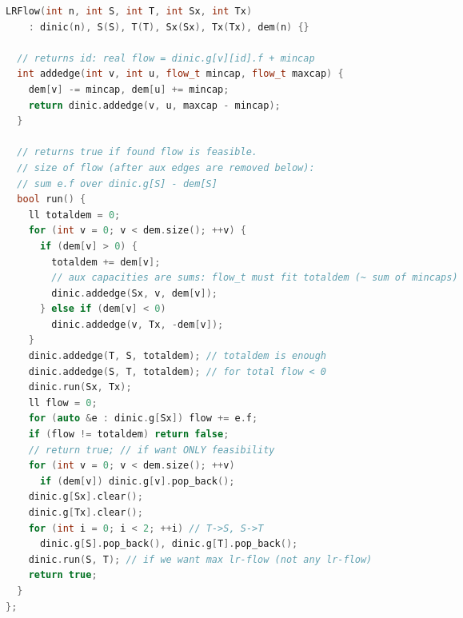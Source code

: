 \documentclass[8pt,a4paper,landscape,twosided]{extarticle}
\begin{document}
\begin{multicols*}{3}
\begin{lstlisting}[language=C++]
  LRFlow(int n, int S, int T, int Sx, int Tx)
    : dinic(n), S(S), T(T), Sx(Sx), Tx(Tx), dem(n) {}

  // returns id: real flow = dinic.g[v][id].f + mincap
  int addedge(int v, int u, flow_t mincap, flow_t maxcap) {
    dem[v] -= mincap, dem[u] += mincap;
    return dinic.addedge(v, u, maxcap - mincap);
  }

  // returns true if found flow is feasible.
  // size of flow (after aux edges are removed below):
  // sum e.f over dinic.g[S] - dem[S]
  bool run() {
    ll totaldem = 0;
    for (int v = 0; v < dem.size(); ++v) {
      if (dem[v] > 0) {
        totaldem += dem[v];
        // aux capacities are sums: flow_t must fit totaldem (~ sum of mincaps)
        dinic.addedge(Sx, v, dem[v]);
      } else if (dem[v] < 0)
        dinic.addedge(v, Tx, -dem[v]);
    }
    dinic.addedge(T, S, totaldem); // totaldem is enough
    dinic.addedge(S, T, totaldem); // for total flow < 0
    dinic.run(Sx, Tx);
    ll flow = 0;
    for (auto &e : dinic.g[Sx]) flow += e.f;
    if (flow != totaldem) return false;
    // return true; // if want ONLY feasibility
    for (int v = 0; v < dem.size(); ++v)
      if (dem[v]) dinic.g[v].pop_back();
    dinic.g[Sx].clear();
    dinic.g[Tx].clear();
    for (int i = 0; i < 2; ++i) // T->S, S->T
      dinic.g[S].pop_back(), dinic.g[T].pop_back();
    dinic.run(S, T); // if we want max lr-flow (not any lr-flow)
    return true;
  }
};
\end{lstlisting}


\end{multicols*}
\end{document}
